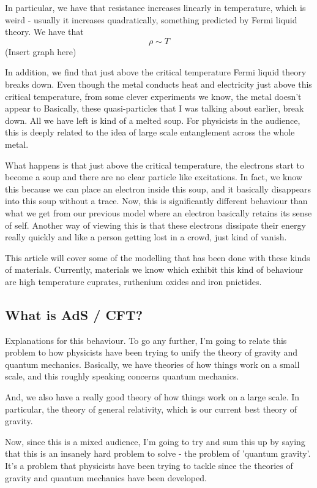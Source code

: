 \documentclass[11pt, oneside]{article}   	%
\theoremstyle{slanted}
\begin{document}
In particular, we have that resistance increases linearly in temperature, 
which is weird - usually it increases quadratically, something predicted 
by Fermi liquid theory. 
We have that 
\[
 \rho \sim T  
\] 
(Insert graph here)

In addition, we find that just above the 
critical temperature Fermi liquid 
theory breaks down. 
Even though the metal conducts heat and 
electricity just above this critical temperature, 
from some clever experiments we know, the 
metal doesn't appear to 
Basically, these quasi-particles 
that I was talking about earlier, break down. 
All we have left is kind of a melted soup. 
For physicists in the audience, this is deeply related 
to the idea of large scale entanglement across the whole metal. 

What happens is that 
just above the critical temperature, 
the electrons start to become a soup and there
are no clear particle like excitations. 
In fact, we know this because we can place an electron inside this 
soup, and it basically disappears into this soup 
without a trace. 
Now, this is significantly different behaviour 
than what we get from 
our previous model where an electron basically retains 
its sense of self. 
Another way of viewing this is 
that these electrons dissipate their energy really quickly and 
like a person getting lost in a crowd, just kind of vanish. 

This article will cover some of the modelling 
that has been done with these kinds of materials.
Currently, materials we know which exhibit this kind of 
behaviour are high temperature cuprates, ruthenium oxides
and iron pnictides. 


\subsection{What is AdS / CFT?}
Explanations for this behaviour. 
To go any further, I'm going to relate this problem 
to how physicists have been trying to unify the 
theory of gravity and quantum mechanics. 
Basically, we have theories of how things 
work on a small scale, and this roughly speaking 
concerns quantum mechanics. 

And, we also have a really good theory of 
how things work on a large scale. In particular, 
the theory of general relativity, which is 
our current best theory of gravity. 

Now, since this is a mixed audience, I'm going to try and
sum this up by saying that this is an insanely hard problem to solve - the problem of 'quantum gravity'. 
It's a problem that physicists have been trying to 
tackle since the theories of gravity and quantum mechanics have been developed. 
\end{document}
